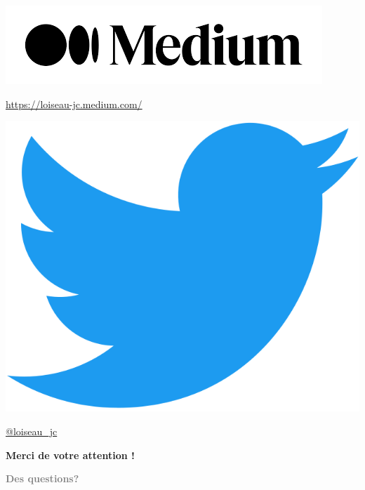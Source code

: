 \documentclass[aspectratio=169, usenames, dvipsnames]{beamer}
\begin{document}
{\begin{frame}
    \bigskip

    \begin{minipage}{.28\textwidth}
      \centering
      \includegraphics[width=\textwidth]{medium}
    \end{minipage}%
    \hfill
    \begin{minipage}{.68\textwidth}
      \url{https://loiseau-jc.medium.com/}
    \end{minipage}

    \bigskip

    \begin{minipage}{.28\textwidth}
      \centering
      \includegraphics[height=.15\textheight]{twitter}
    \end{minipage}%
    \hfill
    \begin{minipage}{.68\textwidth}
      \url{@loiseau_jc}
    \end{minipage}

  \end{frame}
}


\begin{frame}
  \vfill
  \flushright

  {
  \Large
  \textbf{Merci de votre attention !}
  }

  \bigskip

  {
  \large
  \textcolor{gray}{
  \textbf{Des questions?}
  }
  }
  \vfill
\end{frame}
\end{document}
